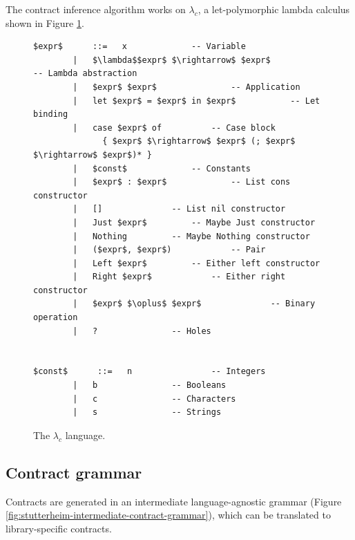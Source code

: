 \documentclass[10pt]{report}
\begin{document}
The contract inference algorithm works on $\lambda_c$, a let-polymorphic lambda calculus shown in Figure \ref{stutterheim-lambda-language}.

\begin{figure}[htps]
\begin{lstlisting}[mathescape]
$expr$      ::=   x				-- Variable
        |   $\lambda$$expr$ $\rightarrow$ $expr$				-- Lambda abstraction
        |   $expr$ $expr$				-- Application
        |   let $expr$ = $expr$ in $expr$			-- Let binding
        |   case $expr$ of			-- Case block
              { $expr$ $\rightarrow$ $expr$ (; $expr$ $\rightarrow$ $expr$)* }
        |   $const$				-- Constants
        |   $expr$ : $expr$				-- List cons constructor
        |   []				-- List nil constructor
        |   Just $expr$			-- Maybe Just constructor
        |   Nothing			-- Maybe Nothing constructor
        |   ($expr$, $expr$)			-- Pair
        |   Left $expr$			-- Either left constructor
        |   Right $expr$			-- Either right constructor
        |   $expr$ $\oplus$ $expr$				-- Binary operation
        |   ?				-- Holes


$const$      ::=   n				-- Integers
        |   b				-- Booleans
        |   c				-- Characters
        |   s				-- Strings
\end{lstlisting}
\caption{\label{stutterheim-lambda-language}The $\lambda_c$ language.}
\end{figure}

\subsection{Contract grammar}

Contracts are generated in an intermediate language-agnostic grammar (Figure \ref{fig:stutterheim-intermediate-contract-grammar}), which can be translated to library-specific contracts.
\end{document}
